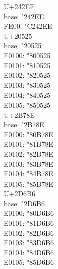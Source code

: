 \documentclass{ujarticle}
\begin{document}
\begin{multicols*}{4}
\newcolumn
U+242EE\\
base: \kchar"242EE\\
FE00: \kchar"C242EE\\
\VS
U+20525\\
base: \kchar"20525\\
E0100: \kchar"800525\\
E0101: \kchar"810525\\
E0102: \kchar"820525\\
E0103: \kchar"830525\\
E0104: \kchar"840525\\
E0105: \kchar"850525\\
\VS
U+2B78E\\
base: \kchar"2B78E\\
E0100: \kchar"80B78E\\
E0101: \kchar"81B78E\\
E0102: \kchar"82B78E\\
E0103: \kchar"83B78E\\
E0104: \kchar"84B78E\\
E0105: \kchar"85B78E\\
\VS
U+2D6B6\\
base: \kchar"2D6B6\\
E0100: \kchar"80D6B6\\
E0101: \kchar"81D6B6\\
E0102: \kchar"82D6B6\\
E0103: \kchar"83D6B6\\
E0104: \kchar"84D6B6\\
E0105: \kchar"85D6B6

\end{multicols*}
\end{document}
